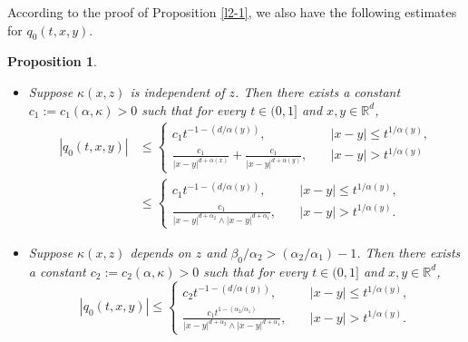 \documentclass[a4paper,11pt]{amsart}
\renewcommand{\le}{\leqslant}
\newcommand{\R}{\mathds R}
\newcommand{\B}{\beta}
\newcommand{\K}{\kappa}
\newcommand{\A}{\alpha}
\newtheorem{proposition}[theorem]{Proposition}
\theoremstyle{definition}
\begin{document}
According to the proof of Proposition \ref{l2-1}, we also have the following estimates for $q_0(t,x,y)$.
\begin{proposition}\label{p2-1} \begin{itemize}
\item [(1)] Suppose $\K(x,z)$ is independent of $z$. Then there exists a constant $c_1:=c_1(\A,\K)>0$ such that
for every $t \in (0,1]$ and $x,y\in \R^d$,
\begin{equation}\label{p2-1-1}\begin{split}
|q_0(t,x,y)|&\le
\begin{cases}
c_1t^{-1-({d}/{\A(y)})},\quad & |x-y|\le t^{{1}/{\A(y)}},\\
\frac{c_1}{|x-y|^{d+\A(x)}}+ \frac{c_1}{|x-y|^{d+\A(y)}},\quad & |x-y|> t^{{1}/{\A(y)}}
\end{cases}\\
&\le
\begin{cases}
c_1t^{-1-({d}/{\A(y)})},\quad & |x-y|\le t^{{1}/{\A(y)}},\\
\frac{c_1}{|x-y|^{d+\A_2}\wedge |x-y|^{d+\A_1}},\quad & |x-y|> t^{{1}/{\A(y)}}.
\end{cases}\end{split}
\end{equation}

\item[(2)] Suppose $\K(x,z)$ depends on $z$ and ${\B_0}/{\A_2}>({\A_2}/{\A_1})-1$. Then there exists a constant $c_2:=c_2(\A,\K)>0$ such that
for every $t \in (0,1]$ and $x,y\in \R^d$,
\begin{equation}\label{p2-1-1a}
|q_0(t,x,y)|\le
\begin{cases}
c_2t^{-1-({d}/{\A(y)})},\quad &|x-y|\le t^{{1}/{\A(y)}},\\
\frac{c_1 t^{1-(\A_2/\A_1)}}{|x-y|^{d+\A_2}\wedge |x-y|^{d+\A_1}},\quad & |x-y| > t^{{1}/{\A(y)}}.
\end{cases}
\end{equation}
\end{itemize}
\end{proposition}
\end{document}
